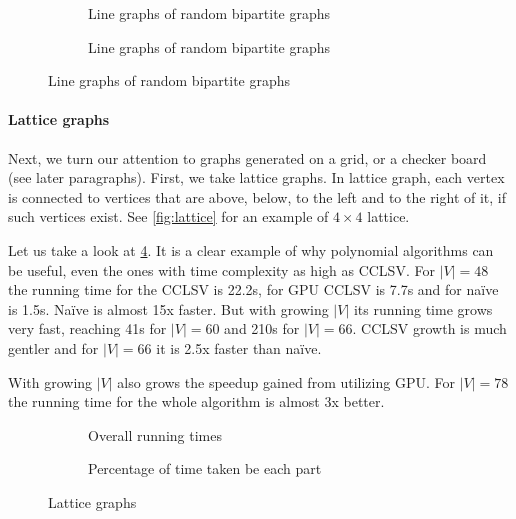 \begin{figure}
  \begin{subfigure}{\textwidth}
    \centering
    
    \caption{Line graphs of random bipartite graphs}
    \label{plot:perf2Lines}
  \end{subfigure}

  \begin{subfigure}{\textwidth}
    \centering
    
    \caption{Line graphs of random bipartite graphs}
    \label{plot:perf2Det}
  \end{subfigure}
  \caption{Line graphs of random bipartite graphs}
\end{figure}

\paragraph{Lattice graphs}

Next, we turn our attention to graphs generated on a grid, or a checker board (see later paragraphs). First, we take lattice graphs. In lattice graph, each vertex is connected to vertices that are above, below, to the left and to the right of it, if such vertices exist. See \cref{fig:lattice} for an example of $4 \times 4$ lattice.

Let us take a look at \cref{plot:gridLines}. It is a clear example of why polynomial algorithms can be useful, even the ones with time complexity as high as CCLSV. For $|V| = 48$ the running time for the CCLSV is 22.2s, for GPU CCLSV is 7.7s and for na\"ive is 1.5s. Na\"ive is almost 15x faster. But with growing $|V|$ its running time grows very fast, reaching 41s for $|V| = 60$ and 210s for $|V| = 66$. CCLSV growth is much gentler and for $|V| = 66$ it is 2.5x faster than na\"ive.

With growing $|V|$ also grows the speedup gained from utilizing GPU. For $|V| = 78$ the running time for the whole algorithm is almost 3x better.

\begin{figure}
  \begin{subfigure}{\textwidth}
    \centering
    
    \caption{Overall running times}
    \label{plot:gridLines}
  \end{subfigure}

  \begin{subfigure}{\textwidth}
    \centering
    
    \caption{Percentage of time taken be each part}
    \label{plot:gridDet}
  \end{subfigure}
  \caption{Lattice graphs}
\end{figure}


